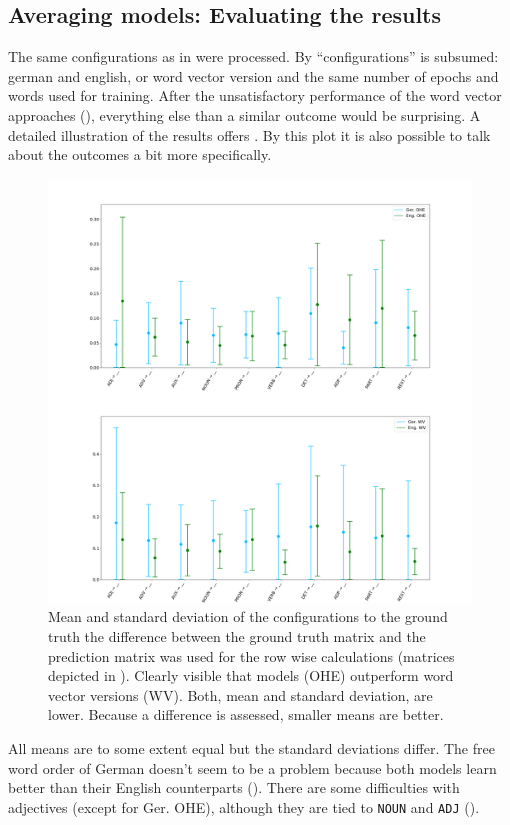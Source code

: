 \subsection{Averaging models: Evaluating the results}
The same configurations as in  were processed. By ``configurations'' is subsumed: german and english, \onehot{} or word vector version and the same number of epochs and words used for training. After the unsatisfactory performance of the word vector approaches (\tabref{\ref{tab: text model versions and metrics}}), everything else than a similar outcome would be surprising. A detailed illustration of the results offers \figref{\ref{fig: rsme plots}}. By this plot it is also possible to talk about the outcomes a bit more specifically.
%
\begin{figure}
	\centering
		\includegraphics[scale=0.325, center]{code/error_com.png}
	\caption{Mean and standard deviation of the configurations \wrt to the ground truth \ie the difference between the ground truth matrix and the prediction matrix was used for the row wise calculations (matrices depicted in \figref{\ref{fig: avg model gt w2v de en}}). Clearly visible that \onehot{} models (OHE) outperform word vector versions (WV). Both, mean and standard deviation, are lower. Because a difference is assessed, smaller means are better.}
	\label{fig: rsme plots}
\end{figure}
All means are to some extent equal but the standard deviations differ. The free word order of German doesn't seem to be a problem because both models learn better than their English counterparts (\tabref{\ref{tab: avg model versions and metrics}}). There are some difficulties with adjectives (except for Ger. OHE), although they are tied to \texttt{NOUN} and \texttt{ADJ} (\figref{\ref{fig: barplot det adp}}).

